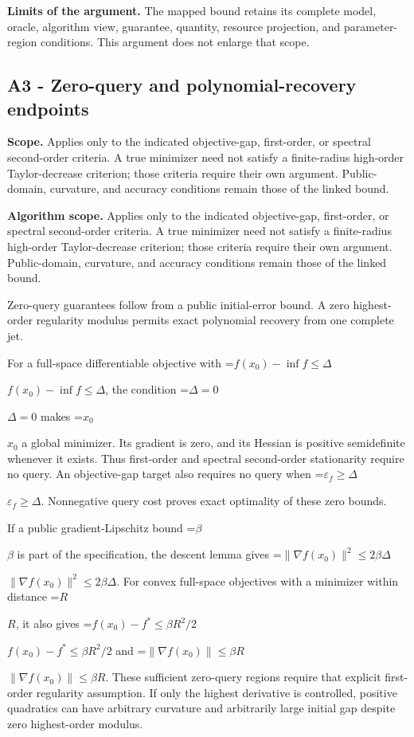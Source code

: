 \documentclass[10pt,a4paper]{article}
\newcommand{\AtlasMath}[1]{\par\begingroup\centering\setbox0=\hbox{$\displaystyle #1$}\ifdim\wd0>1.4\linewidth\typeout{ATLAS WIDE FORMULA: \the\wd0}\fi\ifdim\wd0>\linewidth\resizebox{\linewidth}{!}{\box0}\else\box0\fi\par\endgroup}
\newcommand{\AtlasInlineMath}[1]{\begingroup\setbox0=\hbox{$#1$}\ifdim\wd0>.4\linewidth\endgroup\AtlasMath{#1}\else\endgroup$#1$\fi}
\begin{document}
\textbf{Limits of the argument.} The mapped bound retains its complete model, oracle, algorithm view, guarantee, quantity, resource projection, and parameter-region conditions. This argument does not enlarge that scope.

\subsection{A3 - Zero-query and polynomial-recovery endpoints}
\textbf{Scope.} Applies only to the indicated objective-gap, first-order, or spectral second-order criteria. A true minimizer need not satisfy a finite-radius high-order Taylor-decrease criterion; those criteria require their own argument. Public-domain, curvature, and accuracy conditions remain those of the linked bound.

\textbf{Algorithm scope.} Applies only to the indicated objective-gap, first-order, or spectral second-order criteria. A true minimizer need not satisfy a finite-radius high-order Taylor-decrease criterion; those criteria require their own argument. Public-domain, curvature, and accuracy conditions remain those of the linked bound.

Zero-query guarantees follow from a public initial-error bound. A zero highest-order regularity modulus permits exact polynomial recovery from one complete jet.

For a full-space differentiable objective with \AtlasInlineMath{f(x_0)-\inf f\le\Delta}, the condition \AtlasInlineMath{\Delta=0} makes \AtlasInlineMath{x_0} a global minimizer. Its gradient is zero, and its Hessian is positive semidefinite whenever it exists. Thus first-order and spectral second-order stationarity require no query. An objective-gap target also requires no query when \AtlasInlineMath{\varepsilon_f\ge\Delta}. Nonnegative query cost proves exact optimality of these zero bounds.

If a public gradient-Lipschitz bound \AtlasInlineMath{\beta} is part of the specification, the descent lemma gives \AtlasInlineMath{\|\nabla f(x_0)\|^2\le2\beta\Delta}. For convex full-space objectives with a minimizer within distance \AtlasInlineMath{R}, it also gives \AtlasInlineMath{f(x_0)-f^*\le\beta R^2/2} and \AtlasInlineMath{\|\nabla f(x_0)\|\le\beta R}. These sufficient zero-query regions require that explicit first-order regularity assumption. If only the highest derivative is controlled, positive quadratics can have arbitrary curvature and arbitrarily large initial gap despite zero highest-order modulus.
\end{document}
